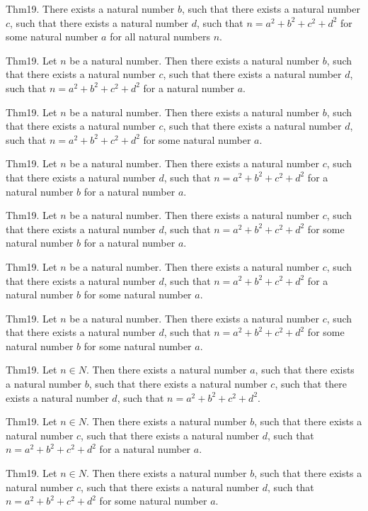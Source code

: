 \documentclass{article}
\begin{document}
Thm19. There exists a natural number $b$, such that there exists a natural number $c$, such that there exists a natural number $d$, such that $n = a ^{ 2}+ b ^{ 2}+ c ^{ 2}+ d ^{ 2}$ for some natural number $a$ for all natural numbers $n$.

Thm19. Let $n$ be a natural number. Then there exists a natural number $b$, such that there exists a natural number $c$, such that there exists a natural number $d$, such that $n = a ^{ 2}+ b ^{ 2}+ c ^{ 2}+ d ^{ 2}$ for a natural number $a$.

Thm19. Let $n$ be a natural number. Then there exists a natural number $b$, such that there exists a natural number $c$, such that there exists a natural number $d$, such that $n = a ^{ 2}+ b ^{ 2}+ c ^{ 2}+ d ^{ 2}$ for some natural number $a$.

Thm19. Let $n$ be a natural number. Then there exists a natural number $c$, such that there exists a natural number $d$, such that $n = a ^{ 2}+ b ^{ 2}+ c ^{ 2}+ d ^{ 2}$ for a natural number $b$ for a natural number $a$.

Thm19. Let $n$ be a natural number. Then there exists a natural number $c$, such that there exists a natural number $d$, such that $n = a ^{ 2}+ b ^{ 2}+ c ^{ 2}+ d ^{ 2}$ for some natural number $b$ for a natural number $a$.

Thm19. Let $n$ be a natural number. Then there exists a natural number $c$, such that there exists a natural number $d$, such that $n = a ^{ 2}+ b ^{ 2}+ c ^{ 2}+ d ^{ 2}$ for a natural number $b$ for some natural number $a$.

Thm19. Let $n$ be a natural number. Then there exists a natural number $c$, such that there exists a natural number $d$, such that $n = a ^{ 2}+ b ^{ 2}+ c ^{ 2}+ d ^{ 2}$ for some natural number $b$ for some natural number $a$.

Thm19. Let $n \in N$. Then there exists a natural number $a$, such that there exists a natural number $b$, such that there exists a natural number $c$, such that there exists a natural number $d$, such that $n = a ^{ 2}+ b ^{ 2}+ c ^{ 2}+ d ^{ 2}$.

Thm19. Let $n \in N$. Then there exists a natural number $b$, such that there exists a natural number $c$, such that there exists a natural number $d$, such that $n = a ^{ 2}+ b ^{ 2}+ c ^{ 2}+ d ^{ 2}$ for a natural number $a$.

Thm19. Let $n \in N$. Then there exists a natural number $b$, such that there exists a natural number $c$, such that there exists a natural number $d$, such that $n = a ^{ 2}+ b ^{ 2}+ c ^{ 2}+ d ^{ 2}$ for some natural number $a$.
\end{document}
